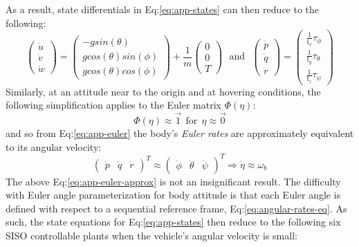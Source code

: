 As a result, state differentials in Eq:\ref{eq:app-states} can then reduce to the following:
\begin{equation}
\begin{pmatrix}
\dot{u}\\
\dot{v}\\
\dot{w}
\end{pmatrix}
=
\begin{pmatrix}
-g sin(\theta)\\
g cos(\theta)sin(\phi)\\
g cos(\theta)cos(\phi)
\end{pmatrix}
+
\frac{1}{m}\begin{pmatrix}
0\\
0\\
T
\end{pmatrix}
~~~\text{and}~~~
\begin{pmatrix}
\dot{p}\\
\dot{q}\\
\dot{r}
\end{pmatrix}
=
\begin{pmatrix}
\frac{1}{\mathbb{I}_x}\tau_\phi\\
\frac{1}{\mathbb{I}_y}\tau_\theta\\
\frac{1}{\mathbb{I}_z}\tau_\psi
\end{pmatrix}
\end{equation}
Similarly, at an attitude near to the origin and at hovering conditions, the following simplification applies to the Euler matrix $\Phi(\eta)$:
\begin{equation}
\Phi(\eta)\approx\vec{1}~~\text{for}~~\eta\approx\vec{0}
\end{equation}
and so from Eq:\ref{eq:app-euler} the body's \emph{Euler rates} are approximately equivalent to its angular velocity:
\begin{equation}\label{eq:app-euler-approx}
\begin{pmatrix}\dot{p}&\dot{q}&\dot{r}\end{pmatrix}^T\approx\begin{pmatrix}\ddot{\phi}&\ddot{\theta}&\ddot{\psi}\end{pmatrix}^T
\Rightarrow
\dot{\eta}\approx\omega_b
\end{equation}
The above Eq:\ref{eq:app-euler-approx} is not an insignificant result. The difficulty with Euler angle parameterization for body attitude is that each Euler angle is defined with respect to a sequential reference frame, Eq:\ref{eq:angular-rates-eq}. As such, the state equations for Eq:\ref{eq:app-states} then reduce to the following six SISO controllable plants when the vehicle's angular velocity is small:
